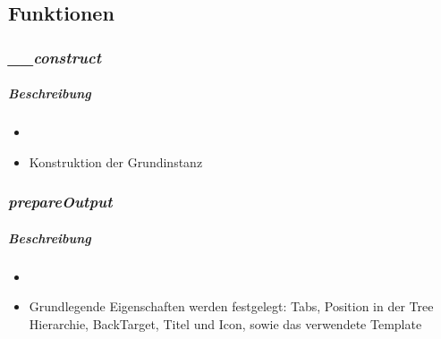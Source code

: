 \paragraph{}
\paragraph{}
\paragraph{}
\paragraph{}
\paragraph{}
\paragraph{}

\subsection*{Funktionen}

\subsubsection*{\textit{\_\_construct}}\label{constructMGUI}
\subparagraph{Beschreibung}
\begin{itemize}
	\item[] \noindent{} 
	\item[] Konstruktion der Grundinstanz
\end{itemize}

\subsubsection*{\textit{prepareOutput}}\label{prepareOutputMGUI}
\subparagraph{Beschreibung}
\begin{itemize}
	\item[] \noindent{}
	\item[] Grundlegende Eigenschaften werden festgelegt: Tabs, Position in der Tree Hierarchie, BackTarget, Titel und Icon, sowie das verwendete Template
\end{itemize}


